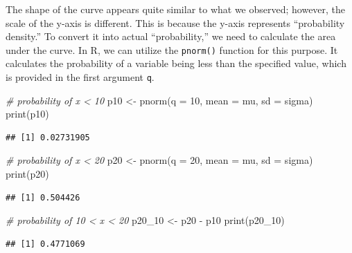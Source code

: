 \documentclass[
]{book}
\newenvironment{Shaded}{\begin{snugshade}}{\end{snugshade}}
\newcommand{\AttributeTok}[1]{\textcolor[rgb]{0.77,0.63,0.00}{#1}}
\newcommand{\CommentTok}[1]{\textcolor[rgb]{0.56,0.35,0.01}{\textit{#1}}}
\newcommand{\DecValTok}[1]{\textcolor[rgb]{0.00,0.00,0.81}{#1}}
\newcommand{\FunctionTok}[1]{\textcolor[rgb]{0.00,0.00,0.00}{#1}}
\newcommand{\NormalTok}[1]{#1}
\newcommand{\OtherTok}[1]{\textcolor[rgb]{0.56,0.35,0.01}{#1}}
\newcommand{\SpecialCharTok}[1]{\textcolor[rgb]{0.00,0.00,0.00}{#1}}
\begin{document}
The shape of the curve appears quite similar to what we observed; however, the scale of the y-axis is different. This is because the y-axis represents ``probability density.'' To convert it into actual ``probability,'' we need to calculate the area under the curve. In R, we can utilize the \texttt{pnorm()} function for this purpose. It calculates the probability of a variable being less than the specified value, which is provided in the first argument \texttt{q}.

\begin{Shaded}
\begin{Highlighting}[]
\CommentTok{\# probability of x \textless{} 10}
\NormalTok{p10 }\OtherTok{\textless{}{-}} \FunctionTok{pnorm}\NormalTok{(}\AttributeTok{q =} \DecValTok{10}\NormalTok{, }\AttributeTok{mean =}\NormalTok{ mu, }\AttributeTok{sd =}\NormalTok{ sigma)}
\FunctionTok{print}\NormalTok{(p10)}
\end{Highlighting}
\end{Shaded}

\begin{verbatim}
## [1] 0.02731905
\end{verbatim}

\begin{Shaded}
\begin{Highlighting}[]
\CommentTok{\# probability of x \textless{} 20}
\NormalTok{p20 }\OtherTok{\textless{}{-}} \FunctionTok{pnorm}\NormalTok{(}\AttributeTok{q =} \DecValTok{20}\NormalTok{, }\AttributeTok{mean =}\NormalTok{ mu, }\AttributeTok{sd =}\NormalTok{ sigma)}
\FunctionTok{print}\NormalTok{(p20)}
\end{Highlighting}
\end{Shaded}

\begin{verbatim}
## [1] 0.504426
\end{verbatim}

\begin{Shaded}
\begin{Highlighting}[]
\CommentTok{\# probability of 10 \textless{} x \textless{} 20}
\NormalTok{p20\_10 }\OtherTok{\textless{}{-}}\NormalTok{ p20 }\SpecialCharTok{{-}}\NormalTok{ p10}
\FunctionTok{print}\NormalTok{(p20\_10)}
\end{Highlighting}
\end{Shaded}

\begin{verbatim}
## [1] 0.4771069
\end{verbatim}
\end{document}
